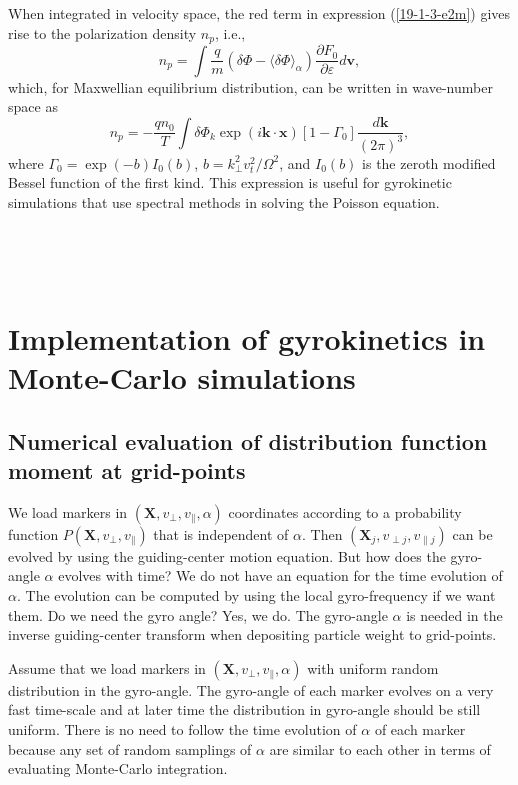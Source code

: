 \documentclass{llncs}
\begin{document}
When integrated in velocity space, the red term in expression
(\ref{19-1-3-e2m}) gives rise to the polarization density $n_p$, i.e.,
\begin{equation}
  n_p = \int \frac{q}{m} (\delta \Phi - \langle \delta \Phi \rangle_{\alpha})
  \frac{\partial F_0}{\partial \varepsilon} d\mathbf{v},
\end{equation}
which, for Maxwellian equilibrium distribution, can be written in wave-number
space as
\begin{equation}
  n_p = - \frac{q n_0}{T} \int \delta \Phi_k \exp (i\mathbf{k} \cdot
  \mathbf{x}) [1 - \Gamma_0] \frac{d\mathbf{k}}{(2 \pi)^3},
\end{equation}
where $\Gamma_0 = \exp (- b) I_0 (b)$, $b = k_{\perp}^2 v_t^2 / \Omega^2$, and
$I_0 (b)$ is the zeroth modified Bessel function of the first kind. This
expression is useful for gyrokinetic simulations that use spectral methods in
solving the Poisson equation.

\

\

\appendix\section{Implementation of gyrokinetics in Monte-Carlo simulations}

\subsection{Numerical evaluation of distribution function moment at
grid-points}

We load markers in $(\mathbf{X}, v_{\perp}, v_{\parallel}, \alpha)$
coordinates according to a probability function $P (\mathbf{X}, v_{\perp},
v_{\parallel})$ that is independent of $\alpha$. Then $(\mathbf{X}_j, v_{\perp
j}, v_{\parallel j})$ can be evolved by using the guiding-center motion
equation. But how does the gyro-angle $\alpha$ evolves with time? We do not
have an equation for the time evolution of $\alpha$. The evolution can be
computed by using the local gyro-frequency if we want them. Do we need the
gyro angle? Yes, we do. The gyro-angle $\alpha$ is needed in the inverse
guiding-center transform when depositing particle weight to grid-points.

Assume that we load markers in $(\mathbf{X}, v_{\perp}, v_{\parallel},
\alpha)$ with uniform random distribution in the gyro-angle. The gyro-angle of
each marker evolves on a very fast time-scale and at later time the
distribution in gyro-angle should be still uniform. There is no need to follow
the time evolution of $\alpha$ of each marker because any set of random
samplings of $\alpha$ are similar to each other in terms of evaluating
Monte-Carlo integration.
\end{document}
